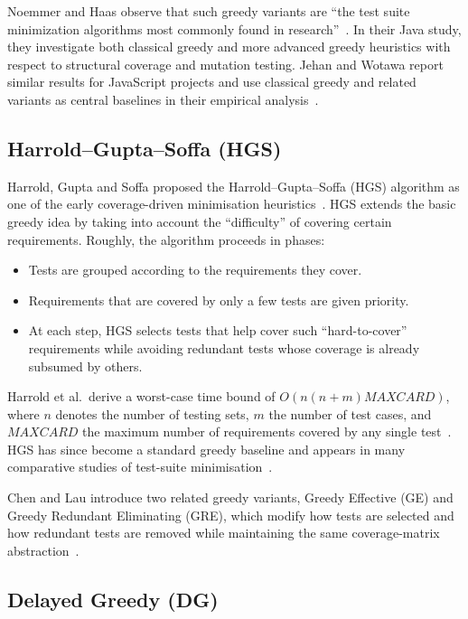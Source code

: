 Noemmer and Haas observe that such greedy variants are ``the test suite minimization
algorithms most commonly found in research''~\cite{noemmer2020}. In their Java
study, they investigate both classical greedy and more advanced greedy heuristics
with respect to structural coverage and mutation testing. Jehan and Wotawa report
similar results for JavaScript projects and use classical greedy and related
variants as central baselines in their empirical analysis~\cite{jehan2023}.

\subsection{Harrold--Gupta--Soffa (HGS)}\label{sec:hgs}

Harrold, Gupta and Soffa proposed the Harrold--Gupta--Soffa (HGS) algorithm as one
of the early coverage-driven minimisation heuristics~\cite{harrold1993}. HGS
extends the basic greedy idea by taking into account the ``difficulty'' of covering
certain requirements. Roughly, the algorithm proceeds in phases:

\begin{itemize}
  \item Tests are grouped according to the requirements they cover.
  \item Requirements that are covered by only a few tests are given priority.
  \item At each step, HGS selects tests that help cover such ``hard-to-cover''
        requirements while avoiding redundant tests whose coverage is already
        subsumed by others.
\end{itemize}

Harrold et al.\ derive a worst-case time bound of
$O(n(n+m)\mathit{MAXCARD})$, where $n$ denotes the number of testing sets,
$m$ the number of test cases, and $\mathit{MAXCARD}$ the maximum number of
requirements covered by any single test~\cite{harrold1993}. HGS has since
become a standard greedy baseline and appears in many comparative studies
of test-suite minimisation~\cite{yoo2012,chen2005,noemmer2020}.

Chen and Lau introduce two related greedy variants, Greedy Effective (GE) and
Greedy Redundant Eliminating (GRE), which modify how tests are selected and how
redundant tests are removed while maintaining the same coverage-matrix
abstraction~\cite{chen2005}.

\subsection{Delayed Greedy (DG)}

